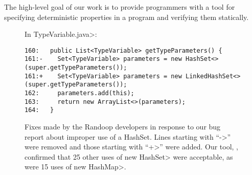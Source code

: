 The high-level goal of our work is to provide programmers with a tool for
specifying deterministic properties in a program and verifying them
statically.

\begin{figure*}

\noindent
In \<TypeVariable.java>:

\begin{Verbatim}
160:   public List<TypeVariable> getTypeParameters() {
161:-    Set<TypeVariable> parameters = new HashSet<>(super.getTypeParameters());
161:+    Set<TypeVariable> parameters = new LinkedHashSet<>(super.getTypeParameters());
162:     parameters.add(this);
163:     return new ArrayList<>(parameters);
164:   }
\end{Verbatim}

\caption{Fixes made by the Randoop developers in response to our bug report
  about improper use of a HashSet.  Lines starting with ``\<->'' were
 removed and those starting with ``\<+>'' were added.
 Our tool, \theDeterminismChecker, confirmed that 
25 other uses of \<new HashSet> were acceptable, as were 15 uses of \<new HashMap>.}
\label{fig:randoop-bug-hashset}
\end{figure*}



